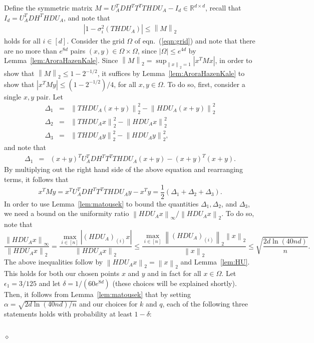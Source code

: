 \documentclass[11pt]{article}
\newcommand{\TNorm }[1]{\mbox{}\left\|#1\right\|_2  }
\newcommand{\VTTNorm }[1]{\mbox{}\left\|#1\right\|_2  }
\newcommand{\VTTNormS}[1]{\mbox{}\left\|#1\right\|_2^2}
\newcommand{\VINorm }[1]{\mbox{}\left\|#1\right\|_{\infty}  }
\newcommand{\abs }[1]{\left|#1\right|}
\newenvironment{Proof}{\noindent {\em Proof:}}{\\\hspace*{\fill}\mbox{$\diamond$}}
\begin{document}
\begin{Proof}
Define the symmetric matrix $M=U_A^TDH^TT^TTHDU_A-I_d \in \mathbb{R}^{d\times d}$, recall that $I_d=U_A^TDH^THDU_A$, and note that
\begin{eqnarray} \label{eqn:eqX32}
\abs{1-\sigma_i^2\left(THDU_A\right)} \leq \TNorm{M}
\end{eqnarray}
holds for all $i \in [d]$. Consider the grid $\Omega$ of eqn.~(\ref{eqn:grid}) and note that there are no more than $e^{8d}$ pairs $(x,y)\in\Omega\times\Omega$, since $\abs{\Omega} \le
e^{4d}$ by Lemma~\ref{lem:AroraHazenKale}. Since $\TNorm{M} = \sup_{\VTTNorm{x}=1}\abs{x^TMx}$, in order to show that $\TNorm{M}\le 1-2^{-1/2}$, it suffices by Lemma~\ref{lem:AroraHazenKale} to show that $\abs{x^TMy}\le \left(1-2^{-1/2}\right)/4$, for all $x,y\in\Omega$. To do so, first, consider a single $x,y$ pair. Let
\begin{eqnarray*}
\Delta_1 &=& \VTTNormS{THDU_A(x+y)}-\VTTNormS{HDU_A(x+y)}  \\
\Delta_2 &=& \VTTNormS{THDU_Ax}-\VTTNormS{HDU_Ax} \\
\Delta_3 &=&\VTTNormS{THDU_Ay}-\VTTNormS{HDU_Ay}  ,
\end{eqnarray*}
and note that
\begin{eqnarray*}
\Delta_1 &=& (x+y)^TU_A^TDH^TT^T THDU_A(x+y)-(x+y)^T(x+y).
\end{eqnarray*}
By multiplying out the right hand side of the above equation and rearranging terms, it follows that
\begin{equation}\label{eqn:pd1}
x^TMy = x^TU_A^TDH^TT^TT HD U_Ay-x^Ty
   = \frac{1}{2}\left( \Delta_1 + \Delta_2 + \Delta_3 \right)   .
\end{equation}
In order to use Lemma~\ref{lem:matousek} to bound the quantities $\Delta_1, \Delta_2$, and $\Delta_3$, we need a bound on the uniformity ratio $\VINorm{HDU_Ax}/\VTTNorm{HDU_Ax}$. To do so, note that
$$
\frac{ \VINorm{HDU_Ax} }{ \VTTNorm{HDU_Ax}}= \frac{ \max_{i \in [n]} \abs{\left(HDU_A\right)_{(i)}x} }{\VTTNorm{HDU_Ax} }
      \le \frac{\max_{i \in [n]} \VTTNorm{\left(HDU_A\right)_{(i)}}\VTTNorm{x}}{\VTTNorm{x}}
      \le \sqrt{\frac{2d \ln(40nd)}{n}}.
$$
The above inequalities follow by $\VTTNorm{HDU_Ax}=\VTTNorm{x}$ and Lemma~\ref{lem:HU}. This holds for both our chosen points $x$ and $y$ and in fact for all $x\in\Omega$. Let $\epsilon_1=3/125$ and let $\delta=1/(60e^{8d})$ (these choices will be explained shortly). Then, it follows from Lemma~\ref{lem:matousek} that by setting $\alpha = \sqrt{2d \ln(40nd)/n}$ and our choices for $k$ and $q$, each of the following three statements holds with probability at least $1-\delta$:

\end{Proof}
\end{document}

